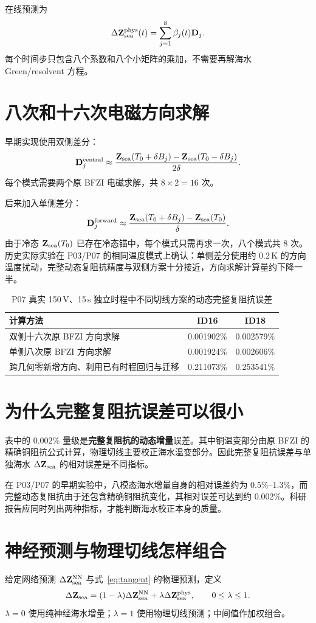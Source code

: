 在线预测为
\begin{equation}
\label{eq:tangent}
\Delta\mathbf Z_{\mathrm{sea}}^{\rm phys}(t)
=\sum_{j=1}^8\beta_j(t)\mathbf D_j.
\end{equation}
每个时间步只包含八个系数和八个小矩阵的乘加，不需要再解海水 Green/resolvent 方程。

\section{八次和十六次电磁方向求解}
早期实现使用双侧差分：
\[
\mathbf D_j^{\rm central}\approx
\frac{\mathbf Z_{\mathrm{sea}}(T_0+\delta B_j)-\mathbf Z_{\mathrm{sea}}(T_0-\delta B_j)}
{2\delta}.
\]
每个模式需要两个原 BFZI 电磁求解，共 $8\times2=16$ 次。

后来加入单侧差分：
\[
\mathbf D_j^{\rm forward}\approx
\frac{\mathbf Z_{\mathrm{sea}}(T_0+\delta B_j)-\mathbf Z_{\mathrm{sea}}(T_0)}{\delta}.
\]
由于冷态 $\mathbf Z_{\mathrm{sea}}(T_0)$ 已存在冷态锚中，每个模式只需再求一次，八个模式共 8 次。历史实际实验在 P03/P07 的相同温度模式上确认：单侧差分使用约 0.2\,K 的方向温度扰动，完整动态复阻抗精度与双侧方案十分接近，方向求解计算量约下降一半。

\begin{table}[htbp]\centering\small
\caption{P07 真实 150\,V、15\,s 独立时程中不同切线方案的动态完整复阻抗误差}
\begin{tabularx}{\textwidth}{Xcc}
\toprule
计算方法 & ID16 & ID18\\
\midrule
双侧十六次原 BFZI 方向求解 & 0.001902\% & 0.002579\%\\
单侧八次原 BFZI 方向求解 & 0.001924\% & 0.002606\%\\
跨几何零新增方向、利用已有时程回归与迁移 & 0.211073\% & 0.253541\%\\
\bottomrule
\end{tabularx}
\end{table}

\section{为什么完整复阻抗误差可以很小}
表中的 $0.002\%$ 量级是\textbf{完整复阻抗的动态增量}误差。其中铜温变部分由原 BFZI 的精确铜阻抗公式计算，物理切线主要校正海水温变部分。因此完整复阻抗误差与单独海水 $\Delta\mathbf Z_{\mathrm{sea}}$ 的相对误差是不同指标。

在 P03/P07 的早期实验中，八模态海水增量自身的相对误差约为 0.5\%--1.3\%，而完整动态复阻抗由于还包含精确铜阻抗变化，其相对误差可达到约 0.002\%。科研报告应同时列出两种指标，才能判断海水校正本身的质量。

\section{神经预测与物理切线怎样组合}
给定网络预测 $\Delta\mathbf Z_{\mathrm{sea}}^{\rm NN}$ 与式~\eqref{eq:tangent} 的物理预测，定义
\begin{equation}
\label{eq:blend}
\Delta\mathbf Z_{\mathrm{sea}}=
(1-\lambda)\Delta\mathbf Z_{\mathrm{sea}}^{\rm NN}
+\lambda\Delta\mathbf Z_{\mathrm{sea}}^{\rm phys},\qquad 0\le\lambda\le1.
\end{equation}
$\lambda=0$ 使用纯神经海水增量；$\lambda=1$ 使用物理切线预测；中间值作加权组合。

